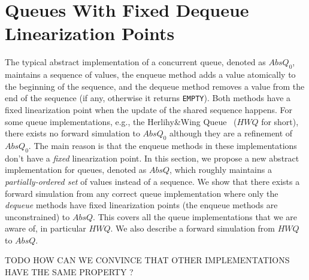 \vspace{-3.5mm}
\section{Queues With Fixed Dequeue Linearization Points}\label{sec:queues}
\vspace{-1.5mm}
The typical abstract implementation of a concurrent queue, denoted as $AbsQ_0$, maintains a sequence of values, the enqueue method adds a value atomically to the beginning of the sequence, and the dequeue method removes a value from the end of the sequence (if any, otherwise it returns {\tt EMPTY}). Both methods have a fixed linearization point when the update of the shared sequence happens. %
For some queue implementations, e.g., the Herlihy\&Wing Queue~\cite{journals/toplas/HerlihyW90} ($\mathit{HWQ}$ for short), there exists no forward simulation to $AbsQ_0$ although they are a refinement of $AbsQ_0$. The main reason is that the enqueue methods in these implementations don't have a \emph{fixed} linearization point. 
In this section, we propose a new abstract implementation for queues, denoted as $AbsQ$, which roughly maintains a \emph{partially-ordered set} of values instead of a sequence. We show that there exists a forward simulation from any correct queue implementation where only the \emph{dequeue} methods have fixed linearization points (the enqueue methods are unconstrained) to $AbsQ$. This covers all the queue implementations that we are aware of, in particular $\mathit{HWQ}$. 
 We also describe a forward simulation from $\mathit{HWQ}$ to $AbsQ$.

TODO HOW CAN WE CONVINCE THAT OTHER IMPLEMENTATIONS HAVE THE SAME PROPERTY ?
\vspace{-3.5mm}

